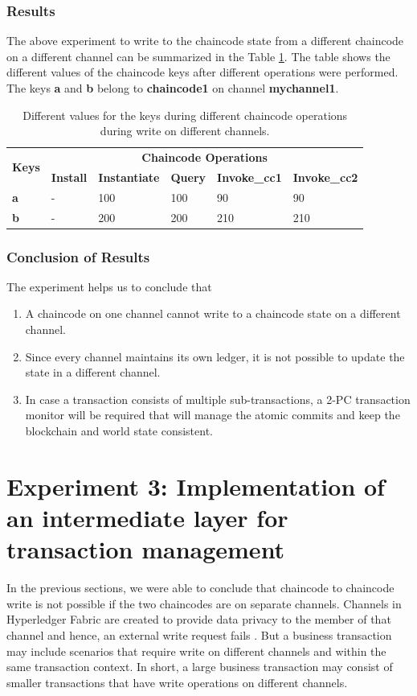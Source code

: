 \documentclass[
  a4paper,  %
  twoside,  %
  bibliography=totoc,
  headsepline,
  cleardoublepage=empty,
  parskip=half,
  draft=false
]{scrbook}
\begin{document}
\subsubsection{Results}
The above experiment to write to the chaincode state from a  different chaincode on a different channel can be summarized in the Table \ref{tab:result22}. The table shows the different values of the chaincode keys after different operations were performed. The keys \textbf{a} and \textbf{b} belong to \textbf{chaincode1} on channel \textbf{mychannel1}.
\begin{table}[h!]
\begin{center}
    \begin{tabular}{ |l|l|l|l|l|l|}
    \hline
    \multirow{2}{*}{\textbf{Keys}} & \multicolumn{5}{c|}{\textbf{Chaincode Operations}}\\ \cline{2-6}
    &\textbf{Install}& \textbf{Instantiate}& \textbf{Query}& \textbf{Invoke\_cc1}& \textbf{Invoke\_cc2} \\ \hline
    \textbf{a} & - & 100 & 100 & 90 & 90 \\ \hline
    \textbf{b} & - & 200 & 200 & 210 & 210 \\ \hline
    \end{tabular}
\end{center}
\caption{Different values for the keys during different chaincode operations during write on different channels.}
\label{tab:result22}
\end{table}
\subsubsection{Conclusion of Results}
The experiment helps us to conclude that 
\begin{enumerate}
\item A chaincode on one channel cannot write to a chaincode state on a different channel.
\item Since every channel maintains its own ledger, it is not possible to update the state in a different channel.
\item In case a transaction consists of multiple sub-transactions, a 2-PC transaction monitor will be required that will manage the atomic commits and keep the blockchain and world state consistent.
\end{enumerate}

\section{Experiment 3: Implementation of an intermediate layer for transaction management}
In the previous sections, we were able to conclude that chaincode to chaincode write is not possible if the two chaincodes are on separate channels. Channels in Hyperledger Fabric are created to provide data privacy to the member of that channel and hence, an external write request fails \cite{Channels}. But a business transaction may include scenarios that require write on different channels and within the same transaction context. In short, a large business transaction may consist of smaller transactions that have write operations on different channels.
\end{document}
